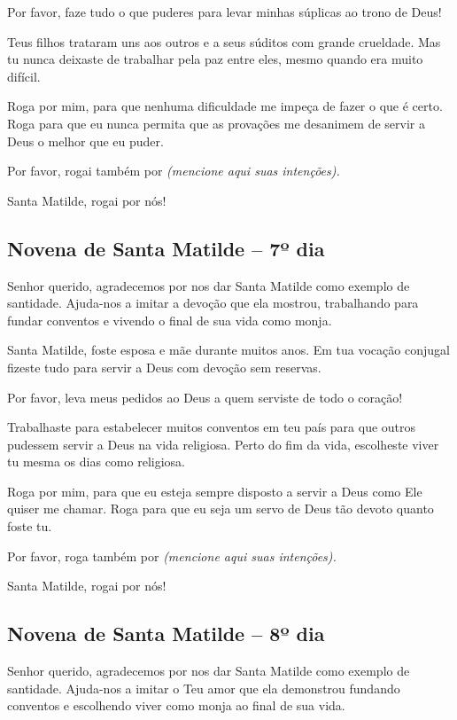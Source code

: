Por favor, faze tudo o que puderes para levar minhas súplicas ao trono de Deus!

Teus filhos trataram uns aos outros e a seus súditos com grande crueldade. Mas tu nunca deixaste de trabalhar pela paz entre eles, mesmo quando era muito difícil.

Roga por mim, para que nenhuma dificuldade me impeça de fazer o que é certo. Roga para que eu nunca permita que as provações me desanimem de servir a Deus o melhor que eu puder.

Por favor, rogai também por \textit{(mencione aqui suas intenções).}

Santa Matilde, rogai por nós!


\subsection{Novena de Santa Matilde – 7º dia}



Senhor querido, agradecemos por nos dar Santa Matilde como exemplo de santidade. Ajuda-nos a imitar a devoção que ela mostrou, trabalhando para fundar conventos e vivendo o final de sua vida como monja.

Santa Matilde, foste esposa e mãe durante muitos anos. Em tua vocação conjugal fizeste tudo para servir a Deus com devoção sem reservas.

Por favor, leva meus pedidos ao Deus a quem serviste de todo o coração!

Trabalhaste para estabelecer muitos conventos em teu país para que outros pudessem servir a Deus na vida religiosa. Perto do fim da vida, escolheste viver tu mesma os dias como religiosa.

Roga por mim, para que eu esteja sempre disposto a servir a Deus como Ele quiser me chamar. Roga para que eu seja um servo de Deus tão devoto quanto foste tu.

Por favor, roga também por \textit{(mencione aqui suas intenções).}

Santa Matilde, rogai por nós!


\subsection{Novena de Santa Matilde – 8º dia}



Senhor querido, agradecemos por nos dar Santa Matilde como exemplo de santidade. Ajuda-nos a imitar o Teu amor que ela demonstrou fundando conventos e escolhendo viver como monja ao final de sua vida.


